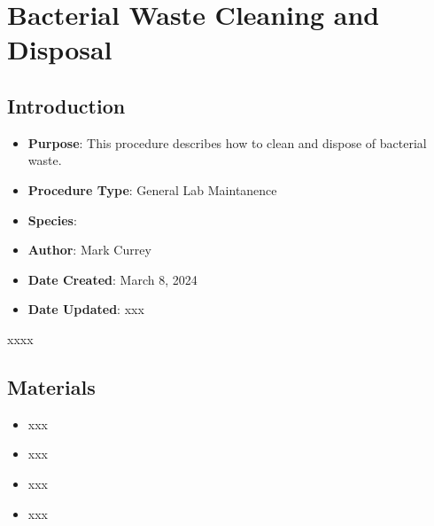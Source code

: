 \documentclass[
  letterpaper,
  DIV=11,
  numbers=noendperiod]{scrreprt}
\providecommand{\tightlist}{%
  \setlength{\itemsep}{0pt}\setlength{\parskip}{0pt}}\usepackage{longtable,booktabs,array}
\begin{document}
\hypertarget{sec-general-bact_waste}{%
\chapter{Bacterial Waste Cleaning and
Disposal}\label{sec-general-bact_waste}}

\hypertarget{introduction-4}{%
\section{Introduction}\label{introduction-4}}

\begin{itemize}
\item
  \textbf{Purpose}: This procedure describes how to clean and dispose of
  bacterial waste.
\item
  \textbf{Procedure Type}: General Lab Maintanence
\item
  \textbf{Species}:
\item
  \textbf{Author}: Mark Currey
\item
  \textbf{Date Created}: March 8, 2024
\item
  \textbf{Date Updated}: xxx
\end{itemize}

\begin{tcolorbox}[enhanced jigsaw, toprule=.15mm, breakable, coltitle=black, leftrule=.75mm, title=\textcolor{quarto-callout-warning-color}{\faExclamationTriangle}\hspace{0.5em}{NOTES}, bottomrule=.15mm, toptitle=1mm, bottomtitle=1mm, colframe=quarto-callout-warning-color-frame, opacityback=0, colback=white, opacitybacktitle=0.6, colbacktitle=quarto-callout-warning-color!10!white, rightrule=.15mm, titlerule=0mm, arc=.35mm, left=2mm]

xxxx

\end{tcolorbox}

\hypertarget{materials-4}{%
\section{Materials}\label{materials-4}}

\begin{itemize}
\tightlist
\item
  xxx
\item
  xxx
\item
  xxx
\item
  xxx
\end{itemize}
\end{document}
